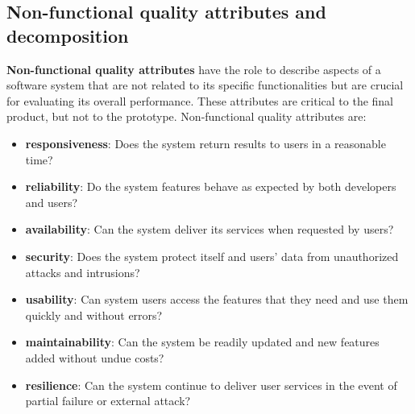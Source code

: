 \subsection{Non-functional quality attributes and decomposition}
\textbf{Non-functional quality attributes} have the role to describe aspects of a software system that are not related to its specific functionalities but are crucial for evaluating its overall performance. These attributes are critical to the final product, but not to the prototype.
Non-functional quality attributes are:
\begin{itemize}

   \item\textbf{responsiveness}: Does the system return results to users in a reasonable time?
   \item\textbf{reliability}: Do the system features behave as expected by both developers and users?
   \item\textbf{availability}: Can the system deliver its services when requested by users?
   \item\textbf{security}: Does the system protect itself and users’ data from unauthorized attacks and intrusions?
   \item\textbf{usability}: Can system users access the features that they need and use them quickly and without errors?
   \item\textbf{maintainability}: Can the system be readily updated and new features added without undue costs?
   \item\textbf{resilience}: Can the system continue to deliver user services in the event of partial failure or external attack?
\end{itemize}


